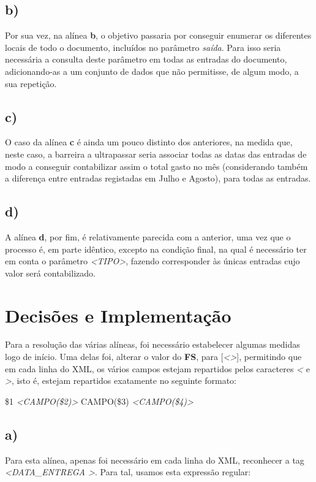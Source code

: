 \documentclass[12pt,a4paper]{report}
\begin{document}
\subsection{b)}
Por sua vez, na alínea \textbf{b}, o objetivo passaria por conseguir enumerar os diferentes locais de todo o documento, incluídos no parâmetro \emph{saída}. Para isso seria necessária a consulta deste parâmetro em todas as entradas do documento, adicionando-as a um conjunto de dados que não permitisse, de algum modo, a sua repetição.

\subsection{c)}
O caso da alínea \textbf{c} é ainda um pouco distinto dos anteriores, na medida que, neste caso, a barreira a ultrapassar seria associar todas as datas das entradas de modo a conseguir contabilizar assim o total gasto no mês (considerando também a diferença entre entradas registadas em Julho e Agosto), para todas as entradas.

\subsection{d)}
A alínea \textbf{d}, por fim, é relativamente parecida com a anterior, uma vez que o processo é, em parte idêntico, excepto na condição final, na qual é necessário ter em conta o parâmetro \emph{\textless TIPO\textgreater}, fazendo corresponder às únicas entradas cujo valor será contabilizado.

\section{Decisões e Implementação}
Para a resolução das várias alíneas, foi necessário estabelecer algumas medidas logo de início. Uma delas foi, alterar o valor do \textbf{FS}, para [\emph{\textless \textgreater}], permitindo que em cada linha do XML, os vários campos estejam repartidos pelos caracteres \emph{\textless} e \emph{\textgreater}, isto é, estejam repartidos exatamente no seguinte formato: \par
\vspace{0.6cm}

\begin{center}
\$1 \emph{\textless CAMPO(\$2)\textgreater} CAMPO(\$3) \emph{\textless CAMPO(\$4)\textgreater}
\end{center}


\subsection{a)}
Para esta alínea, apenas foi necessário em cada linha do XML, reconhecer a tag \emph{\textless DATA\_ENTREGA \textgreater}. Para tal, usamos esta expressão regular: \par
\end{document}
